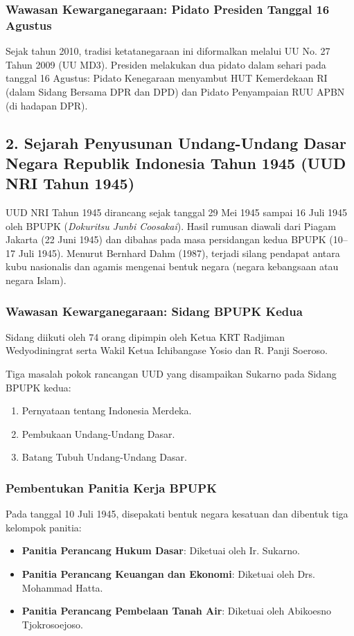 \subsubsection{Wawasan Kewarganegaraan: Pidato Presiden Tanggal 16 Agustus}
Sejak tahun 2010, tradisi ketatanegaraan ini diformalkan melalui UU No. 27 Tahun 2009 (UU MD3). Presiden melakukan dua pidato dalam sehari pada tanggal 16 Agustus: Pidato Kenegaraan menyambut HUT Kemerdekaan RI (dalam Sidang Bersama DPR dan DPD) dan Pidato Penyampaian RUU APBN (di hadapan DPR).


\subsection{2. Sejarah Penyusunan Undang-Undang Dasar Negara Republik Indonesia Tahun 1945 (UUD NRI Tahun 1945)}
UUD NRI Tahun 1945 dirancang sejak tanggal 29 Mei 1945 sampai 16 Juli 1945 oleh BPUPK (\textit{Dokuritsu Junbi Coosakai}). Hasil rumusan diawali dari Piagam Jakarta (22 Juni 1945) dan dibahas pada masa persidangan kedua BPUPK (10--17 Juli 1945). Menurut Bernhard Dahm (1987), terjadi silang pendapat antara kubu nasionalis dan agamis mengenai bentuk negara (negara kebangsaan atau negara Islam).

\subsubsection{Wawasan Kewarganegaraan: Sidang BPUPK Kedua}
Sidang diikuti oleh 74 orang dipimpin oleh Ketua KRT Radjiman Wedyodiningrat serta Wakil Ketua Ichibangase Yosio dan R. Panji Soeroso.

Tiga masalah pokok rancangan UUD yang disampaikan Sukarno pada Sidang BPUPK kedua:
\begin{enumerate}
    \item Pernyataan tentang Indonesia Merdeka.
    \item Pembukaan Undang-Undang Dasar.
    \item Batang Tubuh Undang-Undang Dasar.
\end{enumerate}

\subsubsection{Pembentukan Panitia Kerja BPUPK}
Pada tanggal 10 Juli 1945, disepakati bentuk negara kesatuan dan dibentuk tiga kelompok panitia:
\begin{itemize}
    \item \textbf{Panitia Perancang Hukum Dasar}: Diketuai oleh Ir. Sukarno.
    \item \textbf{Panitia Perancang Keuangan dan Ekonomi}: Diketuai oleh Drs. Mohammad Hatta.
    \item \textbf{Panitia Perancang Pembelaan Tanah Air}: Diketuai oleh Abikoesno Tjokrosoejoso.
\end{itemize}

